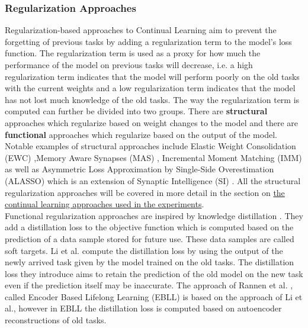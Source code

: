 \subsubsection{Regularization Approaches}
\label{sec:RegularizationApproaches}
Regularization-based approaches to Continual Learning aim to prevent the forgetting of previous tasks by adding a regularization
term to the model's loss function. The regularization term is used as a proxy for how much the performance of the model on previous
tasks will decrease, i.e. a high regularization term indicates that the model will perform poorly on the old tasks with the current
weights and a low regularization term indicates that the model has not lost much knowledge of the old tasks. The way the
regularization term is computed can further be divided into two groups. There are \textbf{structural} approaches which regularize
based on weight changes to the model and there are \textbf{functional} approaches which regularize based on the output of the model.
Notable examples of structural approaches include Elastic Weight Consolidation (EWC) \cite{kirkpatrick2017overcoming},Memory Aware
Synapses (MAS) \cite{aljundi2018memory}, Incremental Moment Matching (IMM) \cite{lee2017overcoming} as well as Asymmetric Loss
Approximation by Single-Side Overestimation (ALASSO) \cite{park2019continual} which is an extension of Synaptic Intelligence (SI)
\cite{zenke2017continual}. All the structural regularization approaches will be covered in more detail in the section on
\hyperref[sec:Related_work:Continual_Learning:Experiments]{the continual learning approaches used in the experiments}. \\
Functional regularization approaches are inspired by knowledge distillation \cite{hinton2015distilling}. They add a distillation
loss to the objective function which is computed based on the prediction of a data sample stored for future use. These data samples
are called soft targets. Li et al. \cite{li2017learning} compute the distillation loss by using the output of the newly arrived task
given by the model trained on the old tasks. The distillation loss they introduce aims to retain the prediction of the old model on
the new task even if the prediction itself may be inaccurate. The approach of Rannen et al. \cite{rannen2017encoder}, called Encoder
Based Lifelong Learning (EBLL) is based on the approach of Li et al., however in EBLL the distillation loss is computed based on
autoencoder reconstructions of old tasks.

